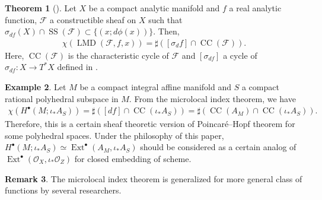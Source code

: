 \documentclass[a4paper,dvipdfmx,reqno,12pt]{amsart}
\theoremstyle{definition}
\newtheorem{theorem}{Theorem}[section]
\newtheorem{definition}[theorem]{Definition}
\newtheorem{example}[theorem]{Example}
\newtheorem{remark}[theorem]{Remark}
\newcommand{\mcal}[1]{\mathcal{#1}}%
\newcommand{\opn}[1]{\operatorname{#1}}
\numberwithin{equation}{section}
\begin{document}
\begin{theorem}[{\cite[Theorem 9.5.6]{MR1299726}}]
Let $X$ be a compact analytic manifold and 
$f$ a real analytic function, $\mathcal{F}$ 
a constructible sheaf on $X$ such that 
$\sigma_{df}(X)\cap \opn{SS}(\mathcal{F})
\subset \{(x;d\phi(x))\}$.
Then, 
\begin{align}
\chi(\opn{LMD}(\mcal{F},f,x))
=\sharp ([\sigma_df]\cap \opn{CC}(\mcal{F})).
\end{align}
Here, $\opn{CC}(\mcal{F})$ is the characteristic cycle of 
$\mathcal{F}$ and $[\sigma_{df}]$ a cycle of 
$\sigma_{df}\colon X\to T^{*}X$ defined in 
\cite[Definition 9.3.5]{MR1299726}.
\end{theorem}

\begin{example}
Let $M$ be a compact integral affine manifold and $S$  
a compact rational polyhedral subspace in $M$. 
From the microlocal index theorem, we have
\begin{align}
\chi(H^{\bullet}(M;\iota_*A_S))
=\sharp ([df]\cap \opn{CC}(\iota_* A_S))
=\sharp (\opn{CC}(A_M)\cap \opn{CC}(\iota_* A_S)).
\end{align}
Therefore, this is a certain sheaf theoretic version of 
Poincar\'e--Hopf theorem for some polyhedral spaces. Under
the philosophy of this paper, $H^{\bullet}(M;\iota_*A_S)\simeq 
\opn{Ext}^{\bullet}(A_M,\iota_*A_S)$
 should be considered as a
certain analog of 
$\opn{Ext}^{\bullet}(\mcal{O}_X,\iota_*\mcal{O}_Z)$ for closed embedding of 
scheme.
\end{example}

\begin{remark}
The microlocal index theorem is generalized for more general 
class of functions by several researchers.
\end{remark}












\end{document}
